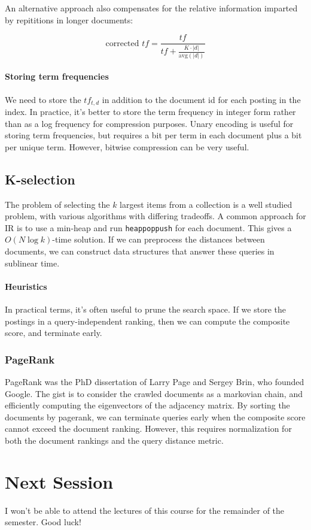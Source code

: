 \documentclass{idc_msc}
\begin{document}
An alternative approach also compensates for the relative information imparted by repititions in longer documents:

\[\text{corrected } tf = \frac{tf}{tf + \frac{K \cdot |d|}{\text{avg}(|d|)}}\]

\paragraph{Storing term frequencies}

We need to store the \(tf_{t,d}\) in addition to the document id for each posting in the index.
In practice, it's better to store the term frequency in integer form rather than as a log frequency for compression purposes.
Unary encoding is useful for storing term frequencies, but requires a bit per term in each document plus a bit per unique term.
However, bitwise compression can be very useful.

\subsection{K-selection}

The problem of selecting the \(k\) largest items from a collection is a well studied problem, with various algorithms with differing tradeoffs.
A common approach for IR is to use a min-heap and run \texttt{heappoppush} for each document.
This gives a \(O(N \log k)\)-time solution.
If we can preprocess the distances between documents, we can construct data structures that answer these queries in sublinear time.

\paragraph{Heuristics}

In practical terms, it's often useful to prune the search space.
If we store the postings in a query-independent ranking, then we can compute the composite score, and terminate early.

\subsubsection{PageRank}

PageRank was the PhD dissertation of Larry Page and Sergey Brin, who founded Google.
The gist is to consider the crawled documents as a markovian chain, and efficiently computing the eigenvectors of the adjacency matrix.
By sorting the documents by pagerank, we can terminate queries early when the composite score cannot exceed the document ranking.
However, this requires normalization for both the document rankings and the query distance metric.

\section{Next Session}

I won't be able to attend the lectures of this course for the remainder of the semester.
Good luck!
\end{document}
